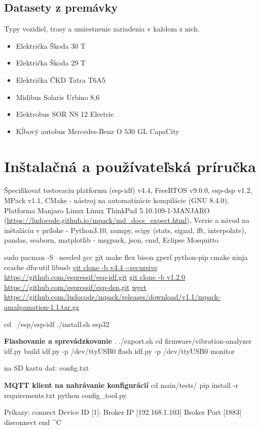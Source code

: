 \section{Datasety z premávky}
Typy vozidiel, trasy a umiestnenie zariadenia v každom z nich.
\begin{itemize}[noitemsep]
\item Električka Škoda 30 T 
\item Električka Škoda 29 T
\item Električka ČKD Tatra T6A5
\item Midibus Solaris Urbino 8,6
\item Elektrobus SOR NS 12 Electric
\item Kĺbový autobus Mercedes-Benz O 530 GL CapaCity
\end{itemize}

\thispagestyle{empty}

\chapter{Inštalačná a používateľská príručka}
\renewcommand*{\thepage}{C-\arabic{page}}
Špecifikovať testovaciu platformu
(esp-idf) v4.4, FreeRTOS v9.0.0, esp-dsp v1.2, MPack v1.1, CMake - nástroj na automatizácie kompilácie (GNU 8.4.0), Platforma Manjaro Linux
	Linux ThinkPad 5.10.109-1-MANJARO (\url{https://ludocode.github.io/mpack/md_docs_expect.html}), Verzie a návod na inštaláciu v prílohe
- Python3.10, numpy, scipy (stats, signal, fft, interpolate), pandas, seaborn, matplotlib
- msgpack, json, cmd,  Eclipse Mosquitto

sudo pacman -S --needed gcc git make flex bison gperf python-pip cmake ninja ccache dfu-util libusb
\url{git clone -b v4.4 --recursive https://github.com/espressif/esp-idf.git}
\url{git clone -b v1.2.0 https://github.com/espressif/esp-dsp.git}
\url{wget https://github.com/ludocode/mpack/releases/download/v1.1/mpack-amalgamation-1.1.tar.gz}


cd ~/esp/esp-idf
./install.sh esp32


\textbf{Flashovanie a sprevádzkovanie}
. ./export.sh
cd firmware/vibration-analyzer
idf.py build
idf.py -p /dev/ttyUSB0 flash
idf.py -p /dev/ttyUSB0 monitor 

na SD kartu dať: config.txt


\textbf{MQTT klient na nahrávanie konfigurácií}
cd  main/tests/
pip install -r requirements.txt
python config\_tool.py

Príkazy:
	connect
		Device ID [1]:
      	Broker IP [192.168.1.103]
        Broker Port [1883]
	disconnect
	end
	^C
	
